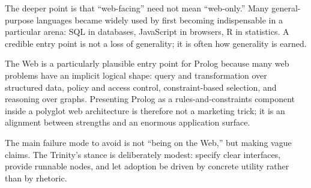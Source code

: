 The deeper point is that ``web-facing'' need not mean ``web-only.'' Many general-purpose languages became widely used by first becoming indispensable in a particular arena: SQL in databases, JavaScript in browsers, R in statistics. A credible entry point is not a loss of generality; it is often how generality is earned.

The Web is a particularly plausible entry point for Prolog because many web problems have an implicit logical shape: query and transformation over structured data, policy and access control, constraint-based selection, and reasoning over graphs. Presenting Prolog as a rules-and-constraints component inside a polyglot web architecture is therefore not a marketing trick; it is an alignment between strengths and an enormous application surface.

The main failure mode to avoid is not ``being on the Web,'' but making vague claims. The Trinity's stance is deliberately modest: specify clear interfaces, provide runnable nodes, and let adoption be driven by concrete utility rather than by rhetoric.

%
%
%

